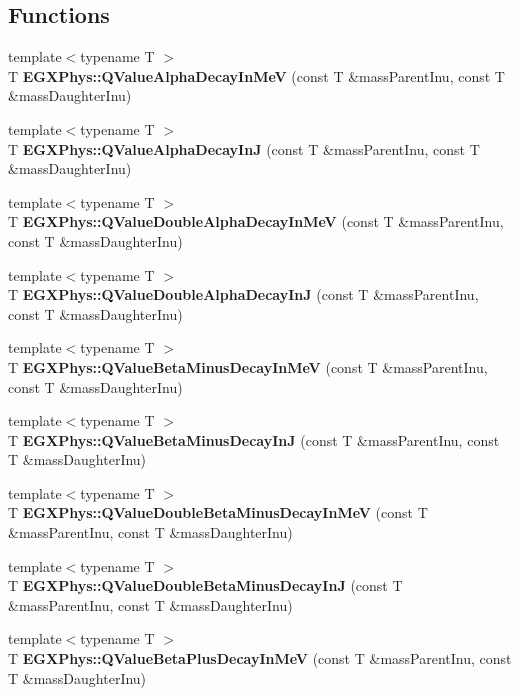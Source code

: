 \subsection*{Functions}
\begin{DoxyCompactItemize}
\item 
{\footnotesize template$<$typename T $>$ }\\T {\bfseries E\+G\+X\+Phys\+::\+Q\+Value\+Alpha\+Decay\+In\+MeV} (const T \&mass\+Parent\+Inu, const T \&mass\+Daughter\+Inu)
\item 
{\footnotesize template$<$typename T $>$ }\\T {\bfseries E\+G\+X\+Phys\+::\+Q\+Value\+Alpha\+Decay\+InJ} (const T \&mass\+Parent\+Inu, const T \&mass\+Daughter\+Inu)
\item 
{\footnotesize template$<$typename T $>$ }\\T {\bfseries E\+G\+X\+Phys\+::\+Q\+Value\+Double\+Alpha\+Decay\+In\+MeV} (const T \&mass\+Parent\+Inu, const T \&mass\+Daughter\+Inu)
\item 
{\footnotesize template$<$typename T $>$ }\\T {\bfseries E\+G\+X\+Phys\+::\+Q\+Value\+Double\+Alpha\+Decay\+InJ} (const T \&mass\+Parent\+Inu, const T \&mass\+Daughter\+Inu)
\item 
{\footnotesize template$<$typename T $>$ }\\T {\bfseries E\+G\+X\+Phys\+::\+Q\+Value\+Beta\+Minus\+Decay\+In\+MeV} (const T \&mass\+Parent\+Inu, const T \&mass\+Daughter\+Inu)
\item 
{\footnotesize template$<$typename T $>$ }\\T {\bfseries E\+G\+X\+Phys\+::\+Q\+Value\+Beta\+Minus\+Decay\+InJ} (const T \&mass\+Parent\+Inu, const T \&mass\+Daughter\+Inu)
\item 
{\footnotesize template$<$typename T $>$ }\\T {\bfseries E\+G\+X\+Phys\+::\+Q\+Value\+Double\+Beta\+Minus\+Decay\+In\+MeV} (const T \&mass\+Parent\+Inu, const T \&mass\+Daughter\+Inu)
\item 
{\footnotesize template$<$typename T $>$ }\\T {\bfseries E\+G\+X\+Phys\+::\+Q\+Value\+Double\+Beta\+Minus\+Decay\+InJ} (const T \&mass\+Parent\+Inu, const T \&mass\+Daughter\+Inu)
\item 
{\footnotesize template$<$typename T $>$ }\\T {\bfseries E\+G\+X\+Phys\+::\+Q\+Value\+Beta\+Plus\+Decay\+In\+MeV} (const T \&mass\+Parent\+Inu, const T \&mass\+Daughter\+Inu)

\end{DoxyCompactItemize}
